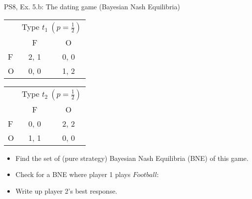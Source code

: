 \begin{frame}{PS8, Ex. 5.b: The dating game (Bayesian Nash Equilibria)}
    \begin{table}
      \begin{tabular}{l|c|c|}
        \multicolumn{1}{c}{} & \multicolumn{2}{c}{Type $t_1\ (p=\frac{1}{2})$} \\
        \multicolumn{1}{c}{} & \multicolumn{1}{c}{F} & \multicolumn{1}{c}{O} \\\cline{2-3}
        F & 2, 1 & 0, 0 \\\cline{2-3}
        O & 0, 0 & 1, 2 \\\cline{2-3}
      \end{tabular}\quad\quad
      \begin{tabular}{l|c|c|}
        \multicolumn{1}{c}{} & \multicolumn{2}{c}{Type $t_2\ (p=\frac{1}{2})$} \\
        \multicolumn{1}{c}{} & \multicolumn{1}{c}{F} & \multicolumn{1}{c}{O} \\\cline{2-3}
        F & 0, 0 & 2, 2 \\\cline{2-3}
        O & 1, 1 & 0, 0 \\\cline{2-3}
      \end{tabular}
    \end{table}
    \begin{itemize}
      \item[(b)] Find the set of (pure strategy) Bayesian Nash Equilibria (BNE) of this game.
    \end{itemize}
    \begin{multicols}{2}
      \begin{itemize}
        \item[Step 1:] Check for a BNE where player 1 plays $Football$:
        \item[1.a:] Write up player 2's best response.
      \end{itemize}
      \vfill\null\columnbreak
      \vfill\null
    \end{multicols}
\end{frame}
